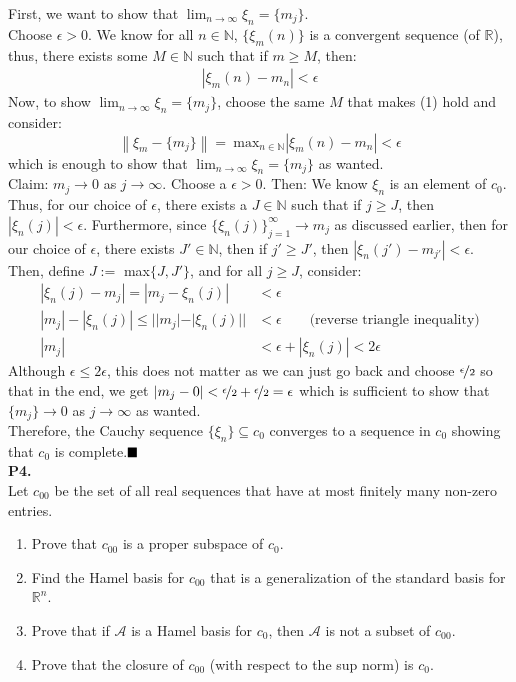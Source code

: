 \documentclass{article}
\newcommand{\norm}[1]{\left\lVert#1\right\rVert}
\begin{document}
    First, we want to show that $\lim_{n\to\infty} \xi_n = \{m_j\}$.\\
    Choose $\epsilon>0$. We know for all $n\in\mathbb{N}$, $\{\xi_m(n)\}$ is a convergent sequence (of $\mathbb{R}$), thus,
    there exists some $M\in\mathbb{N}$ such that if $m\geq M$, then:
    \begin{align}
        |\xi_m(n) - m_n| < \epsilon
    \end{align}
    Now, to show $\lim_{n\to\infty} \xi_n = \{m_j\}$, choose the same $M$ that makes (1) hold and consider:
    \[ \norm{\xi_m - \{m_j\}} =\:\text{max}_{n\in\mathbb{N}}|\xi_m(n) - m_n| < \epsilon \]
    which is enough to show that $\lim_{n\to\infty} \xi_n = \{m_j\}$ as wanted.\\

    Claim: $m_j \to 0$ as $j\to\infty$. Choose a $\epsilon>0$. Then:
    We know $\xi_n$ is an element of $c_0$. Thus, for our choice of $\epsilon$, there exists a $J\in\mathbb{N}$ such that
    if $j\geq J$, then $|\xi_n(j)| < \epsilon$. Furthermore, since $\{\xi_n(j)\}_{j=1}^{\infty} \to m_j$ as discussed earlier,
    then for our choice of $\epsilon$, there exists $J'\in\mathbb{N}$, then if $j'\geq J'$, then $|\xi_n(j')-m_{j'}|<\epsilon$.
    Then, define $J :=$ max$\{J,J'\}$, and for all $j\geq J$, consider:
    \begin{align*}
        |\xi_n(j) - m_j| = |m_j - \xi_n(j)| &< \epsilon \\
        |m_j| - |\xi_n(j)| \leq ||m_j| - |\xi_n(j)|| &< \epsilon \qquad\text{(reverse triangle inequality)}\\
        |m_j| &< \epsilon + |\xi_n(j)| < 2\epsilon
    \end{align*}
    Although $\epsilon \leq 2\epsilon$, this does not matter as we can just go back and choose $\nicefrac{\epsilon}{2}$ so that
    in the end, we get $|m_j - 0| < \nicefrac{\epsilon}{2} + \nicefrac{\epsilon}{2} = \epsilon$ which is sufficient to show
    that $\{m_j\}\to 0$ as $j\to\infty$ as wanted.\\
    
    Therefore, the Cauchy sequence $\{\xi_n\}\subseteq c_0$ converges to a sequence in $c_0$ showing that $c_0$ 
    is complete.$\hfill\blacksquare$\\

    \textbf{P4.}\\

    Let $c_{00}$ be the set of all real sequences that have at most finitely many non-zero entries.
    \begin{enumerate}
        \item Prove that $c_{00}$ is a proper subspace of $c_0$.
        \item Find the Hamel basis for $c_{00}$ that is a generalization of the standard basis for $\mathbb{R}^n$.
        \item Prove that if $\mathcal{A}$ is a Hamel basis for $c_0$, then $\mathcal{A}$ is not a subset of $c_{00}$.
        \item Prove that the closure of $c_{00}$ (with respect to the sup norm) is $c_0$.
    \end{enumerate}
\end{document}
